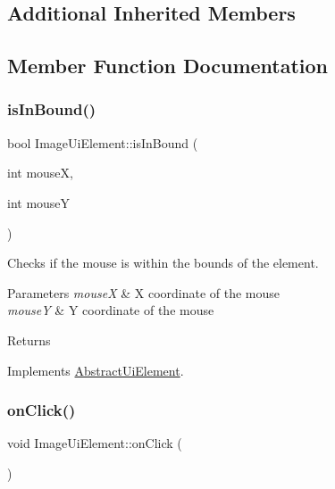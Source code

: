 \subsection*{Additional Inherited Members}


\subsection{Member Function Documentation}
\mbox{\label{class_image_ui_element_a6d0f66cf68c5f035f5a9bfeaba3028f4}} 
\subsubsection{\texorpdfstring{is\+In\+Bound()}{isInBound()}}
{\footnotesize\ttfamily bool Image\+Ui\+Element\+::is\+In\+Bound (\begin{DoxyParamCaption}\item[{int}]{mouseX,  }\item[{int}]{mouseY }\end{DoxyParamCaption})\hspace{0.3cm}{\ttfamily [virtual]}}



Checks if the mouse is within the bounds of the element. 


\begin{DoxyParams}{Parameters}
{\em mouseX} & X coordinate of the mouse\\
\hline
{\em mouseY} & Y coordinate of the mouse\\
\hline
\end{DoxyParams}
\begin{DoxyReturn}{Returns}

\end{DoxyReturn}


Implements \mbox{\hyperlink{class_abstract_ui_element_ad2c415461cd7e8c1ee50b1105eb84685}{Abstract\+Ui\+Element}}.

\mbox{\label{class_image_ui_element_ab3c388de0807d86016a2ff43fd6d337e}} 
\subsubsection{\texorpdfstring{on\+Click()}{onClick()}}
{\footnotesize\ttfamily void Image\+Ui\+Element\+::on\+Click (\begin{DoxyParamCaption}{ }\end{DoxyParamCaption})\hspace{0.3cm}{\ttfamily [virtual]}}



